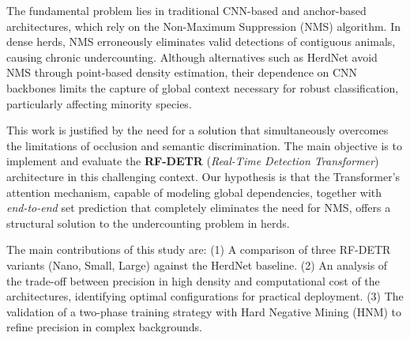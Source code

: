 The fundamental problem lies in traditional CNN-based and anchor-based architectures, which rely on the Non-Maximum Suppression (NMS) algorithm. In dense herds, NMS erroneously eliminates valid detections of contiguous animals, causing chronic undercounting. Although alternatives such as HerdNet \cite{herdnet} avoid NMS through point-based density estimation, their dependence on CNN backbones limits the capture of global context necessary for robust classification, particularly affecting minority species.

This work is justified by the need for a solution that simultaneously overcomes the limitations of occlusion and semantic discrimination. The main objective is to implement and evaluate the \textbf{RF-DETR} (\textit{Real-Time Detection Transformer}) \cite{rf-detr} architecture in this challenging context. Our hypothesis is that the Transformer's attention mechanism, capable of modeling global dependencies, together with \textit{end-to-end} set prediction that completely eliminates the need for NMS, offers a structural solution to the undercounting problem in herds.

The main contributions of this study are: (1) A comparison of three RF-DETR variants (Nano, Small, Large) against the HerdNet baseline. (2) An analysis of the trade-off between precision in high density and computational cost of the architectures, identifying optimal configurations for practical deployment. (3) The validation of a two-phase training strategy with Hard Negative Mining (HNM) to refine precision in complex backgrounds.
